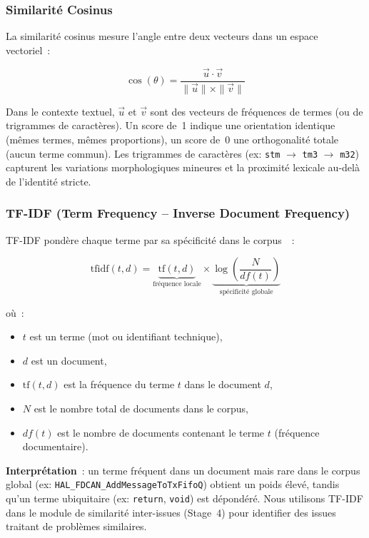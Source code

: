 \subsubsection{Similarité Cosinus}

La similarité cosinus mesure l'angle entre deux vecteurs dans un espace vectoriel~:

\begin{equation}
\cos(\theta) = \frac{\vec{u} \cdot \vec{v}}{\|\vec{u}\| \times \|\vec{v}\|}
\label{eq:cosine_def}
\end{equation}

Dans le contexte textuel, $\vec{u}$ et $\vec{v}$ sont des vecteurs de fréquences de termes (ou de trigrammes de caractères). Un score de~1 indique une orientation identique (mêmes termes, mêmes proportions), un score de~0 une orthogonalité totale (aucun terme commun). Les trigrammes de caractères (ex: \texttt{stm} $\to$ \texttt{tm3} $\to$ \texttt{m32}) capturent les variations morphologiques mineures et la proximité lexicale au-delà de l'identité stricte.

\subsubsection{TF-IDF (Term Frequency -- Inverse Document Frequency)}

TF-IDF pondère chaque terme par sa spécificité dans le corpus~\cite{tfidf}~:

\begin{equation}
\text{tfidf}(t, d) = \underbrace{\text{tf}(t, d)}_{\text{fréquence locale}} \times \underbrace{\log\left(\frac{N}{df(t)}\right)}_{\text{spécificité globale}}
\label{eq:tfidf_def}
\end{equation}

où~:
\begin{itemize}[nosep]
  \item $t$ est un terme (mot ou identifiant technique),
  \item $d$ est un document,
  \item $\text{tf}(t, d)$ est la fréquence du terme $t$ dans le document $d$,
  \item $N$ est le nombre total de documents dans le corpus,
  \item $df(t)$ est le nombre de documents contenant le terme $t$ (fréquence documentaire).
\end{itemize}

\textbf{Interprétation}~: un terme fréquent dans un document mais rare dans le corpus global (ex: \texttt{HAL\_FDCAN\_AddMessageToTxFifoQ}) obtient un poids élevé, tandis qu'un terme ubiquitaire (ex: \texttt{return}, \texttt{void}) est dépondéré. Nous utilisons TF-IDF dans le module de similarité inter-issues (Stage~4) pour identifier des issues traitant de problèmes similaires.


